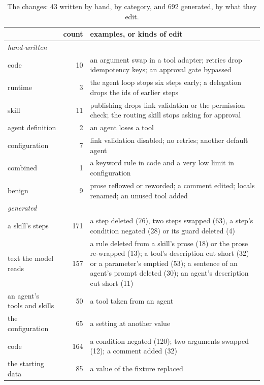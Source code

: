 \documentclass[11pt,a4paper]{article}
\begin{document}
\begin{table}[!htbp]
\centering\small
\caption{The changes: 43 written by hand, by category, and 692 generated, by what they edit.}
\label{tab:changes}
\begin{tabular}{lrp{96mm}}
\toprule
 & count & examples, or kinds of edit \\
\midrule
\multicolumn{3}{l}{\emph{hand-written}} \\
code & 10 & an argument swap in a tool adapter; retries drop idempotency keys; an approval gate bypassed \\
runtime & 3 & the agent loop stops six steps early; a delegation drops the ids of earlier steps \\
skill & 11 & publishing drops link validation or the permission check; the routing skill stops asking for approval \\
agent definition & 2 & an agent loses a tool \\
configuration & 7 & link validation disabled; no retries; another default agent \\
combined & 1 & a keyword rule in code and a very low limit in configuration \\
benign & 9 & prose reflowed or reworded; a comment edited; locals renamed; an unused tool added \\
\midrule
\multicolumn{3}{l}{\emph{generated}} \\
a skill's steps & 171 & a step deleted (76), two steps swapped (63), a step's condition negated (28) or its guard deleted (4) \\
text the model reads & 157 & a rule deleted from a skill's prose (18) or the prose re-wrapped (13); a tool's description cut short (32) or a parameter's emptied (53); a sentence of an agent's prompt deleted (30); an agent's description cut short (11) \\
an agent's tools and skills & 50 & a tool taken from an agent \\
the configuration & 65 & a setting at another value \\
code & 164 & a condition negated (120); two arguments swapped (12); a comment added (32) \\
the starting data & 85 & a value of the fixture replaced \\
\bottomrule
\end{tabular}
\end{table}
\end{document}
